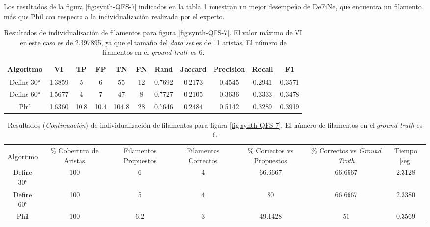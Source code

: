 Los resultados de la figura \ref{fig:synth-QFS-7} indicados en la tabla \ref{tab:synth-QFS-7-Results} muestran un mejor desempe\~no de DeFiNe, que encuentra un filamento m\'as que Phil con respecto a la individualizaci\'on realizada por el experto.

\begin{table}[h]
    \centering
    \begin{tabular}{|c|c|c|c|c|c|c|c|c|c|c|}
    \hline
        Algoritmo & VI & TP & FP &TN &FN & Rand	& Jaccard &	Precision &	Recall &	F1 \\ \hline
        Define 30° & 1.3859 & 5 & 6 & 55 & 12 & 0.7692  & 0.2173 & 0.4545 & 0.2941 & 0.3571\\
        Define 60° & 1.5677 & 4 & 7 & 47 & 8  & 0.7727  & 0.2105  & 0.3636  & 0.3333 & 0.3478\\ 
        Phil & 1.6360 & 10.8 & 10.4 & 104.8 & 28 & 0.7646 & 0.2484 & 0.5142 & 0.3289 & 0.3919\\
        \hline
    \end{tabular}
    \caption{Resultados de individualizaci\'on de filamentos para figura \ref{fig:synth-QFS-7}. El valor m\'aximo de VI en este caso es de 2.397895, ya que el tama\~no del {\it data set} es de 11 aristas. El n\'umero de filamentos en el {\it ground truth} es 6.}
    \label{tab:synth-QFS-7-Results}
\end{table}
\addtocounter{table}{-1}
\begin{table}[h]
    \centering
    \begin{tabular}{|c|c|c|c|c|c|c|}
    \hline
         & \multirow{4}{2cm}{\centering \% Cobertura de Aristas} & \multirow{4}{2cm}{Filamentos Propuestos} & \multirow{4}{2cm}{Filamentos Correctos} & \multirow{4}{2.5cm}{\% Correctos vs Propuestos} & \multirow{4}{2.5cm}{\centering \% Correctos vs {\it Ground Truth}} & \multirow{4}{1.2cm}{\centering Tiempo [seg]} \\
         &  &  &  & & &  \\
        Algoritmo &  &  &  & & &  \\
        &  &  &  & & &  \\ \hline
        Define 30° & 100 & 6 & 4 & 66.6667 & 66.6667 & 2.3128\\
        Define 60° & 100 & 5 & 4 & 80 & 66.6667 & 2.3380\\ 
        Phil & 100 & 6.2 & 3 & 49.1428 & 50  & 0.3569\\
        \hline
    \end{tabular}
    \caption{Resultados ({\it Continuaci\'on}) de individualizaci\'on de filamentos para figura \ref{fig:synth-QFS-7}. El n\'umero de filamentos en el {\it ground truth} es 6.}
\end{table}


